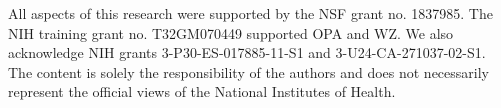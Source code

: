 All aspects of this research were supported by the NSF grant no. 1837985. The NIH training grant no. T32GM070449 supported OPA and WZ. We also acknowledge NIH grants 3-P30-ES-017885-11-S1 and 3-U24-CA-271037-02-S1. 
The content is solely the responsibility of the authors and does not necessarily represent the official views of the National Institutes of Health.